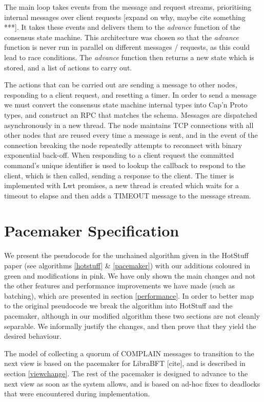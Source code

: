 The main loop takes events from the message and request streams, prioritising internal messages over client requests [expand on why, maybe cite something ***]. It takes these events and delivers them to the \textit{advance} function of the consensus state machine. This architecture was chosen so that the \textit{advance} function is never run in parallel on different messages / requests, as this could lead to race conditions. The \textit{advance} function then returns a new state which is stored, and a list of actions to carry out.

The actions that can be carried out are sending a message to other nodes, responding to a client request, and resetting a timer. In order to send a message we must convert the consensus state machine internal types into Cap'n Proto types, and construct an RPC that matches the schema. Messages are dispatched asynchronously in a new thread. The node maintains TCP connections with all other nodes that are reused every time a message is sent, and in the event of the connection breaking the node repeatedly attempts to reconnect with binary exponential back-off. When responding to a client request the committed command's unique identifier is used to lookup the callback to respond to the client, which is then called, sending a response to the client. The timer is implemented with Lwt promises, a new thread is created which waits for a timeout to elapse and then adds a TIMEOUT message to the message stream.

\section{Pacemaker Specification} \label{spec}
We present the pseudocode for the unchained algorithm given in the HotStuff paper (see algorithms \ref{hotstuff} \& \ref{pacemaker}) with our additions coloured in green and modifications in pink. We have only shown the main changes and not the other features and performance improvements we have made (such as batching), which are presented in section \ref{performance}. In order to better map to the original pseudocode we break the algorithm into HotStuff and the pacemaker, although in our modified algorithm these two sections are not cleanly separable. We informally justify the changes, and then prove that they yield the desired behaviour.

The model of collecting a quorum of COMPLAIN messages to transition to the next view is based on the pacemaker for LibraBFT [cite], and is described in section \ref{viewchange}. The rest of the pacemaker is designed to advance to the next view as soon as the system allows, and is based on ad-hoc fixes to deadlocks that were encountered during implementation.

